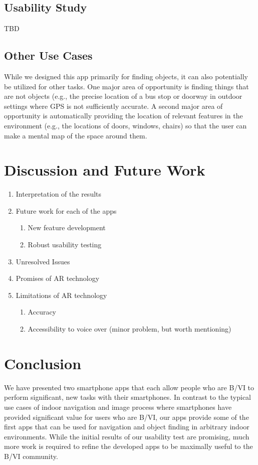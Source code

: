 \documentclass[chi_draft]{sigchi}
\begin{document}
\subsection{Usability Study}
TBD

\subsection{Other Use Cases}
While we designed this app primarily for finding objects, it can also potentially be utilized for other tasks.  One major area of opportunity is finding things that are not objects (e.g., the precise location of a bus stop or doorway in outdoor settings where GPS is not sufficiently accurate.  A second major area of opportunity is automatically providing the location of relevant features in the environment (e.g., the locations of doors, windows, chairs) so that the user can make a mental map of the space around them.

\section{Discussion and Future Work}
\begin{enumerate}
\item Interpretation of the results
\item Future work for each of the apps
\begin{enumerate}
\item New feature development
\item Robust usability testing
\end{enumerate}
\item Unresolved Issues
\item Promises of AR technology
\item Limitations of AR technology
\begin{enumerate}
\item Accuracy
\item Accessibility to voice over (minor problem, but worth mentioning)
\end{enumerate}
\end{enumerate}

\section{Conclusion}
We have presented two smartphone apps that each allow people who are B/VI to perform significant, new tasks with their smartphones.  In contrast to the typical use cases of indoor navigation and image process where smartphones have provided significant value for users who are B/VI, our apps provide some of the first apps that can be used for navigation and object finding in arbitrary indoor environments.  While the initial results of our usability test are promising, much more work is required to refine the developed apps to be maximally useful to the B/VI community.
\end{document}
